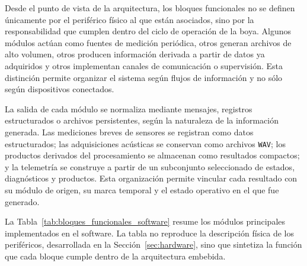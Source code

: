 Desde el punto de vista de la arquitectura, los bloques funcionales no se definen únicamente por el periférico físico al que están asociados, sino por la responsabilidad que cumplen dentro del ciclo de operación de la boya. Algunos módulos actúan como fuentes de medición periódica, otros generan archivos de alto volumen, otros producen información derivada a partir de datos ya adquiridos y otros implementan canales de comunicación o supervisión. Esta distinción permite organizar el sistema según flujos de información y no sólo según dispositivos conectados.

La salida de cada módulo se normaliza mediante mensajes, registros estructurados o archivos persistentes, según la naturaleza de la información generada. Las mediciones breves de sensores se registran como datos estructurados; las adquisiciones acústicas se conservan como archivos \texttt{WAV}; los productos derivados del procesamiento se almacenan como resultados compactos; y la telemetría se construye a partir de un subconjunto seleccionado de estados, diagnósticos y productos. Esta organización permite vincular cada resultado con su módulo de origen, su marca temporal y el estado operativo en el que fue generado.


La Tabla~\ref{tab:bloques_funcionales_software} resume los módulos principales implementados en el software. La tabla no reproduce la descripción física de los periféricos, desarrollada en la Sección~\ref{sec:hardware}, sino que sintetiza la función que cada bloque cumple dentro de la arquitectura embebida.

